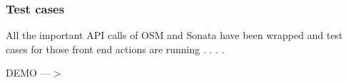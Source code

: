 \begin{frame}
\frametitle{Test cases}

All the important API calls of OSM and Sonata have been wrapped and test cases for those front end actions are running . . . . 


\Huge{\centerline{DEMO ---$ > $}}
\end{frame}